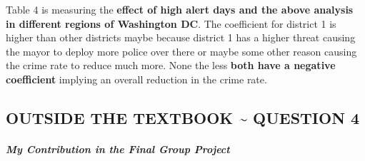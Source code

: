 \documentclass[
]{article}
\begin{document}
Table 4 is measuring the \textbf{effect of high alert days and the above
analysis in different regions of Washington DC}. The coefficient for
district 1 is higher than other districts maybe because district 1 has a
higher threat causing the mayor to deploy more police over there or
maybe some other reason causing the crime rate to reduce much more. None
the less \textbf{both have a negative coefficient} implying an overall
reduction in the crime rate.

\hypertarget{outside-the-textbook-question-4}{%
\subsection{OUTSIDE THE TEXTBOOK \textasciitilde{} QUESTION
4}\label{outside-the-textbook-question-4}}

\hypertarget{my-contribution-in-the-final-group-project}{%
\subparagraph{\texorpdfstring{\textbf{My Contribution in the Final Group
Project}}{My Contribution in the Final Group Project}}\label{my-contribution-in-the-final-group-project}}
\end{document}
